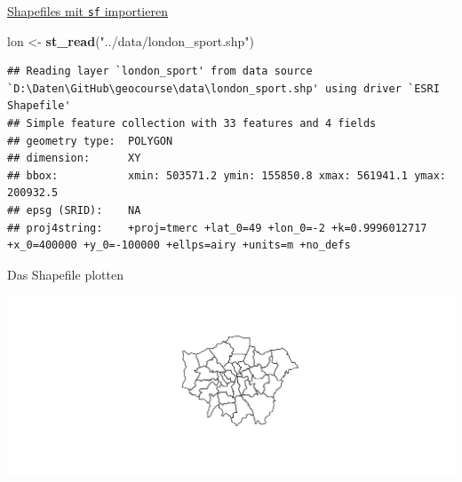\documentclass[ignorenonframetext,]{beamer}
\newenvironment{Shaded}{\begin{snugshade}}{\end{snugshade}}
\newcommand{\KeywordTok}[1]{\textcolor[rgb]{0.13,0.29,0.53}{\textbf{#1}}}
\newcommand{\StringTok}[1]{\textcolor[rgb]{0.31,0.60,0.02}{#1}}
\newcommand{\OperatorTok}[1]{\textcolor[rgb]{0.81,0.36,0.00}{\textbf{#1}}}
\newcommand{\NormalTok}[1]{#1}
\begin{document}
\begin{frame}[fragile]{\href{https://cran.r-project.org/web/packages/sf/vignettes/sf2.html}{Shapefiles
mit \texttt{sf} importieren}}

\begin{Shaded}
\begin{Highlighting}[]
\NormalTok{lon <-}\StringTok{ }\KeywordTok{st_read}\NormalTok{(}\StringTok{"../data/london_sport.shp"}\NormalTok{)}
\end{Highlighting}
\end{Shaded}

\begin{verbatim}
## Reading layer `london_sport' from data source `D:\Daten\GitHub\geocourse\data\london_sport.shp' using driver `ESRI Shapefile'
## Simple feature collection with 33 features and 4 fields
## geometry type:  POLYGON
## dimension:      XY
## bbox:           xmin: 503571.2 ymin: 155850.8 xmax: 561941.1 ymax: 200932.5
## epsg (SRID):    NA
## proj4string:    +proj=tmerc +lat_0=49 +lon_0=-2 +k=0.9996012717 +x_0=400000 +y_0=-100000 +ellps=airy +units=m +no_defs
\end{verbatim}

\end{frame}

\begin{frame}[fragile]{Das Shapefile plotten}

\begin{Shaded}
\end{Shaded}

\includegraphics{slides_all2gether_part2_files/figure-beamer/unnamed-chunk-195-1.pdf}

\end{frame}
\end{document}
